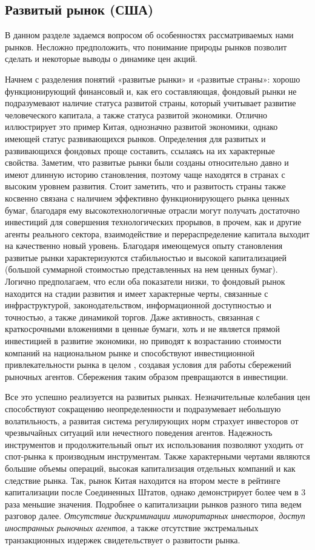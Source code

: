 \subsection{Развитый рынок (США)}
В данном разделе задаемся вопросом об особенностях рассматриваемых нами рынков. Несложно предположить, что понимание природы рынков позволит сделать и некоторые выводы о динамике цен акций.

Начнем с разделения понятий «развитые рынки» и «развитые страны»: хорошо функционирующий финансовый и, как его составляющая, фондовый рынки не подразумевают наличие статуса развитой страны, который учитывает развитие человеческого капитала, а также статуса развитой экономики. Отлично иллюстрирует это пример Китая, однозначно развитой экономики, однако имеющей статус развивающихся рынков. Определения для развитых и развивающихся фондовых проще составить, ссылаясь на их характерные свойства. Заметим, что развитые рынки были созданы относительно давно и имеют длинную историю становления, поэтому чаще находятся в странах с высоким уровнем развития. Стоит заметить, что и развитость страны также косвенно связана с наличием эффективно функционирующего рынка ценных бумаг, благодаря ему высокотехнологичные отрасли могут получать достаточно инвестиций для совершения технологических прорывов, в прочем, как и другие агенты реального сектора, взаимодействие и перераспределение капитала выходит на качественно новый уровень. Благодаря имеющемуся опыту становления развитые рынки характеризуются стабильностью и высокой капитализацией (большой суммарной стоимостью представленных на нем ценных бумаг). Логично предполагаем, что если оба показатели низки, то фондовый рынок находится на стадии развития и имеет характерные черты, связанные с инфраструктурой, законодательством, информационной доступностью и точностью, а также динамикой торгов. Даже активность, связанная с краткосрочными вложениями в ценные бумаги, хоть и не является прямой инвестицией в развитие экономики, но приводят к возрастанию стоимости компаний на национальном рынке и способствуют инвестиционной привлекательности рынка в целом \cite{kulakov2016economic}, создавая условия для работы сбережений рыночных агентов. Сбережения таким образом превращаются в инвестиции.

Все это успешно реализуется на развитых рынках. Незначительные колебания цен способствуют сокращению неопределенности и подразумевает небольшую волатильность, а развитая система регулирующих норм страхует инвесторов от чрезвычайных ситуаций или нечестного поведения агентов. Надежность инструментов и продолжительный опыт их использования позволяют уходить от спот-рынка к производным инструментам. Также характерными чертами являются большие объемы операций, высокая капитализация отдельных компаний и как следствие рынка. Так, рынок Китая находится на втором месте в рейтинге капитализации \cite{statista2023distribution} после Соединенных Штатов, однако демонстрирует более чем в 3 раза меньшие значения. Подробнее о капитализации рынков разного типа ведем разговор далее. \textit{Отсутствие дискриминации миноритарных инвесторов, доступ иностранных рыночных агентов}, а также отсутствие экстремальных транзакционных издержек свидетельствует о развитости рынка. 

